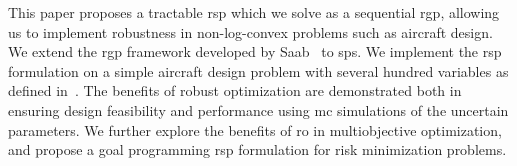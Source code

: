 This paper proposes a tractable \gls{rsp} which we solve as a sequential \gls{rgp},
allowing us to implement robustness in non-log-convex problems such as aircraft design.
We extend the \gls{rgp} framework developed by Saab~\cite{Saab2018} to \gls{sp}s.
We implement the \gls{rsp} formulation on a simple aircraft design problem with several hundred
variables as defined in~\cite{Ozturk2018}.
The benefits of robust optimization are demonstrated both in ensuring design feasibility and performance
using \gls{mc} simulations of the uncertain parameters.
We further explore the benefits of \gls{ro} in multiobjective optimization, and propose
a goal programming \gls{rsp} formulation for risk minimization problems.


